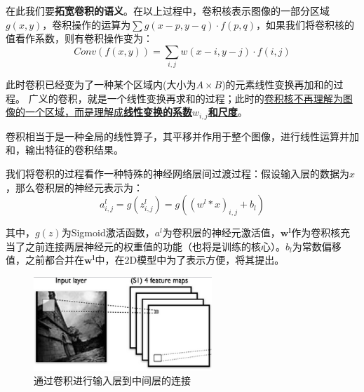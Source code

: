 在此我们要\textbf{拓宽卷积的语义}。在以上过程中，卷积核表示图像的一部分区域$g(x,y)$，卷积操作的运算为$\sum g(x-p,y-q)\cdot f(p,q)$，如果我们将卷积核的值看作系数，则有卷积操作变为：
\begin{equation}
Conv(f(x,y))  = \sum_{i,j} w(x-i,y-j)\cdot f(i,j)
\end{equation}

此时卷积已经变为了一种某个区域内(大小为$A\times B$)的元素线性变换再加和的过程。
广义的卷积，就是一个线性变换再求和的过程；此时的\uline{卷积核不再理解为图像的一个区域，而是理解成\textbf{线性变换的系数$w_{i,j}$和尺度}}。

卷积相当于是一种全局的线性算子，其平移并作用于整个图像，进行线性运算并加和，输出特征的卷积结果。

我们将卷积的过程看作一种特殊的神经网络层间过渡过程：假设输入层的数据为$x$，那么卷积层的神经元表示为：
\begin{equation}
\label{eqn:conv}
a^l_{i,j} = g(z^l_{i,j}) = g((w^l \ast x)_{i,j} + b_l)
\end{equation}

其中，$g(z)$为Sigmoid激活函数，$a^l$为卷积层的神经元激活值，$\mathbf{w^l}$作为卷积核充当了之前连接两层神经元的权重值的功能（也将是训练的核心）。$b_l$为常数偏移值，之前都合并在$\mathbf{w^l}$中，在2D模型中为了表示方便，将其提出。

\begin{figure}[htbp]
   \centering
   \includegraphics[width=0.6\textwidth]{ConvolutionKernal.png} %
   \caption{通过卷积进行输入层到中间层的连接}
   \label{fig:convker}
\end{figure}


